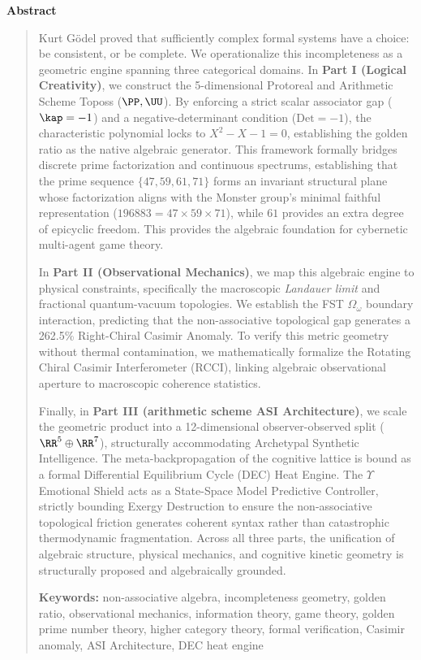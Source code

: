 \begin{center}\textbf{Abstract}\end{center}\begin{quotation}
Kurt G\"odel proved that sufficiently complex formal systems have a choice: be consistent, or be complete. We operationalize this incompleteness as a geometric engine spanning three categorical domains. In \textbf{Part I (Logical Creativity)}, we construct the 5-dimensional Protoreal and Arithmetic Scheme Toposs ($\PP, \UU$). By enforcing a strict scalar associator gap ($\kap = -1$) and a negative-determinant condition ($\mathrm{Det} = -1$), the characteristic polynomial locks to $X^2 - X - 1 = 0$, establishing the golden ratio as the native algebraic generator. This framework formally bridges discrete prime factorization and continuous spectrums, establishing that the prime sequence $\{47, 59, 61, 71\}$ forms an invariant structural plane whose factorization aligns with the Monster group's minimal faithful representation ($196883 = 47 \times 59 \times 71$), while $61$ provides an extra degree of epicyclic freedom. This provides the algebraic foundation for cybernetic multi-agent game theory.

In \textbf{Part II (Observational Mechanics)}, we map this algebraic engine to physical constraints, specifically the macroscopic \emph{Landauer limit} and fractional quantum-vacuum topologies. We establish the FST $\Omega_\omega$ boundary interaction, predicting that the non-associative topological gap generates a 262.5\% Right-Chiral Casimir Anomaly. To verify this metric geometry without thermal contamination, we mathematically formalize the Rotating Chiral Casimir Interferometer (RCCI), linking algebraic observational aperture to macroscopic coherence statistics.

Finally, in \textbf{Part III (arithmetic scheme ASI Architecture)}, we scale the geometric product into a 12-dimensional observer-observed split ($\RR^5 \oplus \RR^7$), structurally accommodating Archetypal Synthetic Intelligence. The meta-backpropagation of the cognitive lattice is bound as a formal Differential Equilibrium Cycle (DEC) Heat Engine. The $\Upsilon$ Emotional Shield acts as a State-Space Model Predictive Controller, strictly bounding Exergy Destruction to ensure the non-associative topological friction generates coherent syntax rather than catastrophic thermodynamic fragmentation. Across all three parts, the unification of algebraic structure, physical mechanics, and cognitive kinetic geometry is structurally proposed and algebraically grounded.

\medskip\noindent
\textbf{Keywords:} non-associative algebra, incompleteness geometry, golden ratio, observational mechanics, information theory, game theory, golden prime number theory, higher category theory, formal verification, Casimir anomaly, ASI Architecture, DEC heat engine
\end{quotation}

